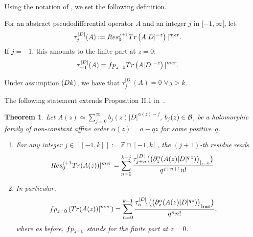 \documentclass[11pt]{article}
\newtheorem{theorem}{Theorem}
\def \Z {\mathbb Z}
\numberwithin{equation}{section}
\begin{document}
Using the notation of \cite{CoMo}, we set the following def\/inition.
\begin{definition}
 For an abstract pseudodif\/ferential operator $  A$ and an integer  $j$ in $ [-1, \infty[$, let
 \begin{gather}\label{eq:taukD}
\tau^{\vert D\vert}_j(A):={\rm Res}^{j+1}_{0} {\rm
    Tr} \left( A  \vert D\vert^{-z}\right)\vert^{\rm mer}.
\end{gather}
If $j=-1$, this amounts to the f\/inite part at $z=0$:
\[
\tau^{\vert D\vert}_{-1}(A)= {\rm fp}_{z=0} {\rm
    Tr} \left( A  \vert D\vert^{-z}\right)\vert^{\rm mer}.
    \]
\end{definition}
\begin{remark}  Under assumption ${\rm (Dk)}$, we have that
$\tau^{\vert D\vert}_j(A)=0$ $ \forall\, j> k$.
\end{remark}

 The
following statement extends Proposition II.1 in~\cite{CoMo}.

\begin{theorem} \label{thm:ResAz} Let $A(z)\simeq \sum\limits_{j=0}^\infty
b_j(z) \vert D\vert^{\alpha(z)-j}$, $b_j(z)\in {\cal B}$, be a holomorphic
family of non-constant affine order
  $\alpha(z)=a-q  z$ for some positive~$q$.
\begin{enumerate}
\itemsep=0pt
\item For any integer $j\in [[-1, k]]:= \Z\cap [-1, k]$, the  $(j+1)$-th residue reads
 \begin{gather*}%
{\rm Res}^{j+1}_{0} {\rm Tr}(A(z))\vert^{\rm mer}= \sum_{n=0}^{k-j}
\frac{\tau_{j+n}^{\vert D\vert}\big(\big(\partial_z^n (A(z)
  \vert D\vert^{q\, z})\big)_{\vert_{z=0}}\big)}{q^{j+n+1}  n!}.
\end{gather*}
\item In particular,
\[
{\rm fp}_{z=0}\left( {\rm Tr}(A(z))\vert^{\rm mer}\right)=
\sum_{n=0}^{k+1}
\frac{\tau_{n-1}^{\vert D\vert}\big(\big(\partial_z^n (A(z)
  \vert D\vert^{q z})\big)_{\vert_{z=0}}\big)}{q^{n}  n!},
\] where as before, ${\rm fp}_{z=0}$ stands for the finite part at $z=0$.
\end{enumerate}
\end{theorem}
\end{document}
